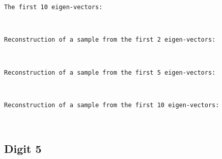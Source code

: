 \documentclass[11pt]{article}
\begin{document}
    \begin{Verbatim}[commandchars=\\\{\}]
The first 10 eigen-vectors:
    \end{Verbatim}

    \begin{center}
    \end{center}
    { \hspace*{\fill} \\}
    
    \begin{Verbatim}[commandchars=\\\{\}]
Reconstruction of a sample from the first 2 eigen-vectors:
    \end{Verbatim}

    \begin{center}
    \end{center}
    { \hspace*{\fill} \\}
    
    \begin{Verbatim}[commandchars=\\\{\}]
Reconstruction of a sample from the first 5 eigen-vectors:
    \end{Verbatim}

    \begin{center}
    \end{center}
    { \hspace*{\fill} \\}
    
    \begin{Verbatim}[commandchars=\\\{\}]
Reconstruction of a sample from the first 10 eigen-vectors:
    \end{Verbatim}

    \begin{center}
    \end{center}
    { \hspace*{\fill} \\}
    \pagebreak
    
    \hypertarget{digit-5}{%
\subsection{Digit 5}\label{digit-5}}
\end{document}

